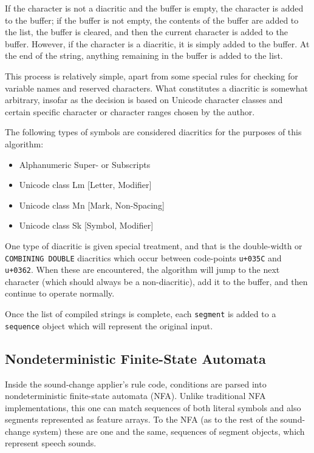 \documentclass[10pt,letterpaper]{article}
\begin{document}
If the character is not a diacritic and the buffer is empty, the character is added to the buffer; if the buffer is not empty, the contents of the buffer are added to the list, the buffer is cleared, and then the current character is added to the buffer. However, if the character is a diacritic, it is simply added to the buffer. At the end of the string, anything remaining in the buffer is added to the list.

This process is relatively simple, apart from some special rules for checking for variable names and reserved characters. What constitutes a diacritic is somewhat arbitrary, insofar as the decision is based on Unicode character classes and certain specific character or character ranges chosen by the author.

The following types of symbols are considered diacritics for the purposes of this algorithm:
\begin{itemize}
\itemsep1pt \parskip0pt  
\item Alphanumeric Super- or Subscripts
\item Unicode class Lm [Letter, Modifier]
\item Unicode class Mn [Mark, Non-Spacing]
\item Unicode class Sk [Symbol, Modifier]
\end{itemize}

One type of diacritic is given special treatment, and that is the double-width or \texttt{COMBINING DOUBLE} diacritics which occur between code-points \texttt{u+035C} and \texttt{u+0362}. When these are encountered, the algorithm will jump to the next character (which should always be a non-diacritic), add it to the buffer, and then continue to operate normally.

Once the list of compiled strings is complete, each \texttt{segment} is added to a \texttt{sequence} object which will represent the original input.

\subsection{Nondeterministic Finite-State Automata}
\label{sub:rndfa}

Inside the sound-change applier's rule code, conditions are parsed into nondeterministic finite-state automata (NFA). Unlike traditional NFA implementations, this one can match sequences of both literal symbols and also segments represented as feature arrays. To the NFA (as to the rest of the sound-change system) these are one and the same, sequences of segment objects, which represent speech sounds.
\end{document}
